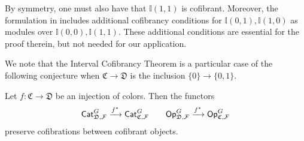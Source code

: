 \documentclass[a4paper,10pt
,draft
]{article}%
\renewcommand{\F}{\mathcal F}
\renewcommand{\1}{\eta}%
\begin{document}
\begin{remark}
By symmetry, one must also have that $\mathbb{I}(1,1)$ is cofibrant.
Moreover, the formulation in \cite[Thm. 1.15]{BM13}
includes additional cofibrancy conditions for
$\mathbb{I}(0,1),\mathbb{I}(1,0)$
as modules over $\mathbb{I}(0,0),\mathbb{I}(1,1)$.
These additional conditions are essential for the proof therein, 
but not needed for our application.
\end{remark}


We note that the Interval Cofibrancy Theorem is a particular case of the following conjecture when $\mathfrak{C} \to \mathfrak{D}$
is the inclusion $\{0\} \to \{0,1\}$.


\begin{conjecture}\label{CATOP CONJ}
Let $f \colon \mathfrak{C} \to \mathfrak{D}$
be an injection of colors.
Then the functors
\[
	\mathsf{Cat}_{\mathfrak{D},\F}^G
	\xrightarrow{f^{\**}}
	\mathsf{Cat}_{\mathfrak{C},\F}^G
\qquad
	\mathsf{Op}_{\mathfrak{D},\F}^G
	\xrightarrow{f^{\**}}
	\mathsf{Op}_{\mathfrak{C},\F}^G
\]
preserve cofibrations between cofibrant objects.
\end{conjecture}
\end{document}
